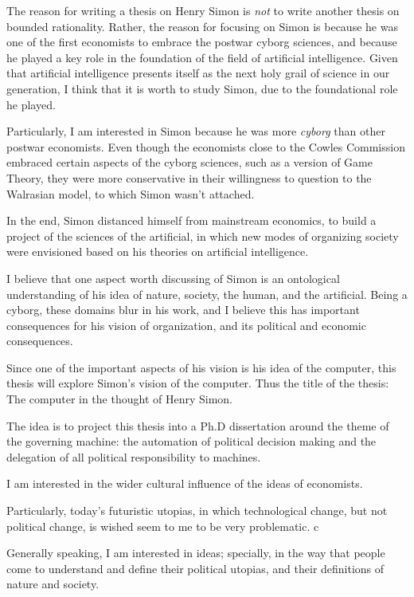 \documentclass[draft=false, paper=A4,portrait,twoside=true,twocolumn=false,headinclude=false,footinclude=false,fontsize=11,BCOR=15mm,DIV=calc,pagesize=auto,titlepage=firstiscover,mpinclude=true,headings=big,headings=twolinechapter,open=right,chapterprefix=false,headsepline=false,parskip=full]{scrbook}
\begin{document}
The reason for writing a thesis on Henry Simon is \emph{not} to write another
thesis on bounded rationality. Rather, the reason for focusing on Simon is
because he was one of the first economists to embrace the postwar cyborg
sciences, and because he played a key role in the foundation of the field
of artificial intelligence. Given that artificial intelligence presents
itself as the next holy grail of science in our generation, I think that it
is worth to study Simon, due to the foundational role he played.

Particularly, I am interested in Simon because he was more \emph{cyborg} than
other postwar economists. Even though the economists close to the Cowles
Commission embraced certain aspects of the cyborg sciences, such as a
version of Game Theory, they were more conservative in their willingness to
question to the Walrasian model, to which Simon wasn't attached. 

In the end, Simon distanced himself from mainstream economics, to build a
project of the sciences of the artificial, in which new modes of organizing
society were envisioned based on his theories on artificial intelligence. 

I believe that one aspect worth discussing of Simon is an ontological
understanding of his idea of nature, society, the human, and the artificial. 
Being a cyborg, these domains blur in his work, and I believe this has
important consequences for his vision of organization, and its political
and economic consequences. 

Since one of the important aspects of his vision is his idea of the
computer, this thesis will explore Simon's vision of the computer. Thus the
title of the thesis: The computer in the thought of Henry Simon.

The idea is to project this thesis into a Ph.D dissertation around the
theme of the governing machine: the automation of political decision making
and the delegation of all political responsibility to machines.

 I am interested in
the wider cultural influence of the ideas of economists.

Particularly, today's futuristic utopias, in which technological change,
but not political change, is wished seem to me to be very problematic. c

Generally speaking, I am interested in ideas; specially, in the way that
people come to understand and define their political utopias, and their
definitions of nature and society.  
\end{document}
